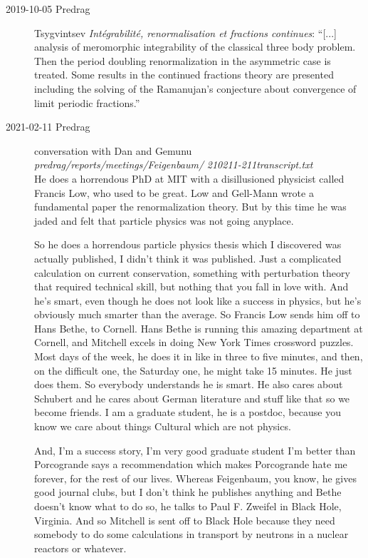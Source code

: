 \begin{description}
\item[2019-10-05 Predrag]
Tsygvintsev
{\em Int{\'e}grabilit{\'e}, renormalisation et fractions continues}:
``[...] analysis of meromorphic integrability of the classical three body
problem. Then the period doubling renormalization in the asymmetric case
is treated. Some results in the continued fractions theory are presented
including the solving of the Ramanujan's conjecture about convergence of
limit periodic fractions.''

\item[2021-02-11 Predrag] conversation with Dan and Gemunu\\
\emph{predrag/reports/meetings/Feigenbaum/}
\emph{210211-211transcript.txt}\\

He does a horrendous PhD at MIT with a disillusioned physicist
called Francis Low, who used to be great. Low and Gell-Mann wrote a
fundamental paper the renormalization theory. But by this time he
was jaded and felt that particle physics was not going anyplace.

So he does a horrendous particle physics thesis which I discovered was
actually published, I didn't think it was published. Just a
complicated calculation on current conservation, something
with perturbation theory that required technical skill, but nothing
that you fall in love with. And he's smart, even though he does not
look like a success in physics, but he's obviously much smarter
than the average. So Francis Low sends him off to Hans Bethe, to
Cornell. Hans Bethe is running this amazing department at Cornell,
and Mitchell excels in doing New York Times crossword puzzles. Most
days of the week, he does it in like in three to five minutes, and
then, on the difficult one, the Saturday one, he might take 15
minutes. He just does them. So everybody understands he is smart.
He also cares about Schubert and he cares about German literature
and stuff like that so we become friends. I am a graduate student,
he is a postdoc, because you know we care about things Cultural
which are not physics.

And, I'm a success story,  I'm very good graduate student I'm
better than Porcogrande says a recommendation which makes
Porcogrande hate me forever, for the rest of our lives.
Whereas Feigenbaum, you know, he gives good journal clubs,
but I don't think he publishes anything and Bethe doesn't know what
to do so, he talks to Paul F. Zweifel in Black Hole, Virginia.
And so Mitchell is sent off to Black Hole because they need somebody to do
some calculations in transport by neutrons in a nuclear reactors
or whatever.


\end{description}

